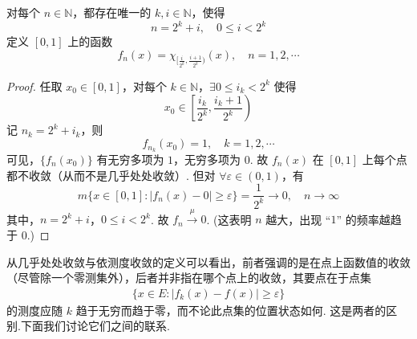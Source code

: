 \documentclass[../../main.tex]{subfiles}
\begin{document}
\begin{example}[依测度收敛但不几乎处处收敛的函数]

对每个 $n\in\mathbb{N}$，都存在唯一的 $k,i\in\mathbb{N}$，使得
\[
n = 2^k + i,\quad 0\leqslant i<2^k
\]
定义 $[0,1]$ 上的函数
\[
f_n(x)=\chi_{[\frac{i}{2^k},\frac{i + 1}{2^k})}(x),\quad n = 1,2,\cdots
\]
\end{example}
\begin{proof}
任取 $x_0\in[0,1]$，对每个 $k\in\mathbb{N}$，$\exists 0\leqslant i_k<2^k$ 使得
\[
x_0\in\left[\frac{i_k}{2^k},\frac{i_k + 1}{2^k}\right)
\]
记 $n_k = 2^k + i_k$，则
\[
f_{n_k}(x_0)=1,\quad k = 1,2,\cdots
\]
可见，$\{f_n(x_0)\}$ 有无穷多项为 $1$，无穷多项为 $0$. 故 $f_n(x)$ 在 $[0,1]$ 上每个点都不收敛（从而不是几乎处处收敛）. 但对 $\forall\varepsilon\in(0,1)$，有
\[
m\{x\in[0,1]:\vert f_n(x)-0\vert\geqslant\varepsilon\}=\frac{1}{2^k}\to 0,\quad n\to\infty
\]
其中，$n = 2^k + i$，$0\leqslant i<2^k$. 故 $f_n\stackrel{\mu}{\longrightarrow}0$. (这表明 $n$ 越大，出现 “$1$” 的频率越趋于 $0$.) 
\end{proof}

\vspace{0.4cm}

从几乎处处收敛与依测度收敛的定义可以看出，前者强调的是在点上函数值的收敛（尽管除一个零测集外），后者并非指在哪个点上的收敛，其要点在于点集
\begin{align*}
\{x\in E:\vert f_k(x)-f(x)\vert\geqslant\varepsilon\}
\end{align*}
的测度应随 $k$ 趋于无穷而趋于零，而不论此点集的位置状态如何. 这是两者的区别.下面我们讨论它们之间的联系.
\end{document}
